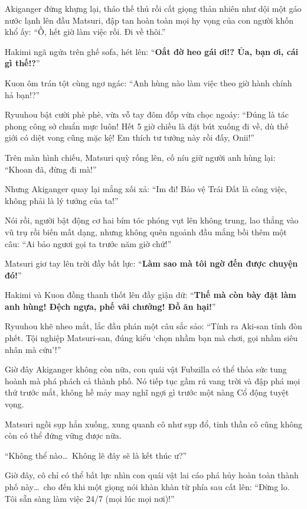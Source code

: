 \documentclass[../main.tex]{subfiles}
\begin{document}

Akiganger đứng khựng lại, tháo thế thủ rồi cất giọng thản nhiên như dội một gáo nước lạnh lên đầu Matsuri, đập tan hoàn toàn mọi hy vọng của con người khốn khổ ấy: ``Ồ, hết giờ làm việc rồi. Đi về thôi.''

Hakimi ngã ngửa trên ghế sofa, hét lên: ``\textbf{Oắt đờ heo gái ơi!? Ủa, bạn ơi, cái gì thế!?}''

Kuon ôm trán tột cùng ngơ ngác: ``Anh hùng nào làm việc theo giờ hành chính hả bạn!?''

Ryuuhou bật cười phè phè, vừa vỗ tay đôm đốp vừa chọc ngoáy: ``Đúng là tác phong công sở chuẩn mực luôn! Hết 5 giờ chiều là đặt bút xuống đi về, dù thế giới có diệt vong cũng mặc kệ! Em thích tư tưởng này rồi đấy, Onii!''

Trên màn hình chiếu, Matsuri quỳ rống lên, cố níu giữ người anh hùng lại: ``Khoan đã, đừng đi mà!''

Nhưng Akiganger quay lại mắng xối xả: ``Im đi! Bảo vệ Trái Đất là công việc, không phải là lý tưởng của ta!''

Nói rồi, người bật động cơ hai bím tóc phóng vụt lên không trung, lao thẳng vào vũ trụ rồi biến mất dạng, nhưng không quên ngoảnh đầu mắng bồi thêm một câu: ``Ai bảo ngươi gọi ta trước năm giờ chứ!''

Matsuri giơ tay lên trời đầy bất lực: ``\textbf{Làm sao mà tôi ngờ đến được chuyện đó!}''


Hakimi và Kuon đồng thanh thốt lên đầy giận dữ: ``\textbf{Thế mà còn bày đặt làm anh hùng! Đệch ngựa, phế vãi chưởng! Đồ ăn hại!}''

Ryuuhou khẽ nheo mắt, lắc đầu phán một câu sắc sảo: ``Tính ra Aki-san tỉnh đòn phết. Tội nghiệp Matsuri-san, đúng kiểu `chọn nhầm bạn mà chơi, gọi nhầm siêu nhân mà cứu'!''

Giờ đây Akiganger không còn nữa, con quái vật Fubzilla có thể thỏa sức tung hoành mà phá phách cả thành phố. Nó tiếp tục gầm rú vang trời và đập phá mọi thứ trước mắt, không hề mảy may nghĩ ngợi gì trước một nàng Cổ động tuyệt vọng.

Matsuri ngồi sụp hẳn xuống, xung quanh cô như sụp đổ, tinh thần cô cũng không còn có thể đứng vững được nữa.

``Không thể nào\dots\ Không lẽ đây sẽ là kết thúc ư?''

Giờ đây, cô chỉ có thể bất lực nhìn con quái vật lai cáo phá hủy hoàn toàn thành phố này\dots\ cho đến khi một giọng nói khàn khàn từ phía sau cất lên: ``Đừng lo. Tôi sẵn sàng làm việc 24/7 (mọi lúc mọi nơi)!''
\end{document}
